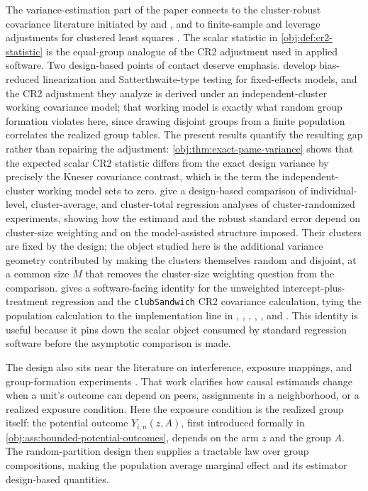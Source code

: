 \documentclass[11pt]{article}
\begin{document}
The variance-estimation part of the paper connects to the cluster-robust covariance literature initiated by \citet{White1980} and \citet{LiangZeger1986}, and to finite-sample and leverage adjustments for clustered least squares \citep{BellMcCaffrey2002,CameronMiller2015,Abadie2023}. The scalar statistic in \cref{obj:def:cr2-statistic} is the equal-group analogue of the CR2 adjustment used in applied software. Two design-based points of contact deserve emphasis. \citet{PustejovskyTipton2018} develop bias-reduced linearization and Satterthwaite-type testing for fixed-effects models, and the CR2 adjustment they analyze is derived under an independent-cluster working covariance model; that working model is exactly what random group formation violates here, since drawing disjoint groups from a finite population correlates the realized group tables. The present results quantify the resulting gap rather than repairing the adjustment: \cref{obj:thm:exact-pame-variance} shows that the expected scalar CR2 statistic differs from the exact design variance by precisely the Kneser covariance contrast, which is the term the independent-cluster working model sets to zero. \citet{SuDing2021} give a design-based comparison of individual-level, cluster-average, and cluster-total regression analyses of cluster-randomized experiments, showing how the estimand and the robust standard error depend on cluster-size weighting and on the model-assisted structure imposed. Their clusters are fixed by the design; the object studied here is the additional variance geometry contributed by making the clusters themselves random and disjoint, at a common size \(M\) that removes the cluster-size weighting question from the comparison.  gives a software-facing identity for the unweighted intercept-plus-treatment regression and the \texttt{clubSandwich} CR2 covariance calculation, tying the population calculation to the implementation line in \citet{PustejovskyTipton2018}, \citet{Zeileis2004}, \citet{Zeileis2006}, \citet{ZeileisKollGraham2020}, \citet{ClubSandwich2026}, and \citet{Sandwich2026}. This identity is useful because it pins down the scalar object consumed by standard regression software before the asymptotic comparison is made.

The design also sits near the literature on interference, exposure mappings, and group-formation experiments \citep{Sobel2006,HudgensHalloran2008,TchetgenTchetgen2012,Manski2013,LiuHudgens2014,AronowSamii2017,Ugander2013,Eckles2017,Athey2018,Li2019,Xu2021,Wang2025,Samii2023,Gao2025}. That work clarifies how causal estimands change when a unit's outcome can depend on peers, assignments in a neighborhood, or a realized exposure condition. Here the exposure condition is the realized group itself: the potential outcome \(Y_{i,n}(z,A)\), first introduced formally in \cref{obj:ass:bounded-potential-outcomes}, depends on the arm \(z\) and the group \(A\). The random-partition design then supplies a tractable law over group compositions, making the population average marginal effect  and its estimator  design-based quantities.
\end{document}
